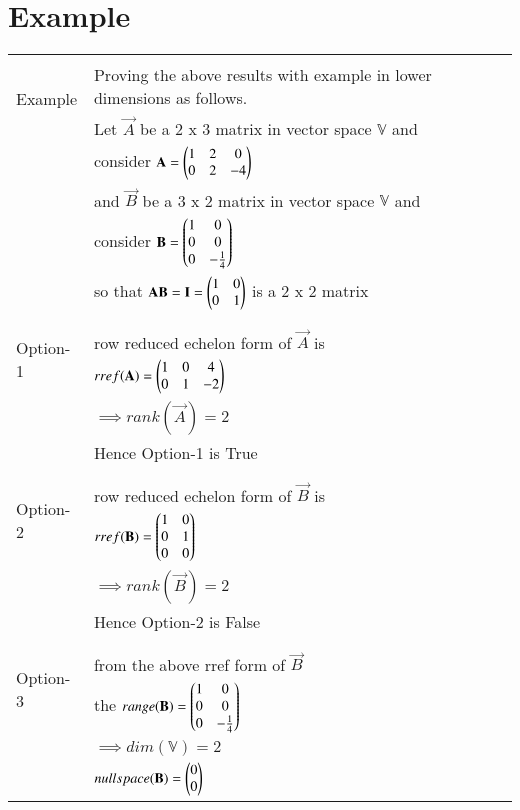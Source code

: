 \documentclass[journal,12pt]{IEEEtran}
\begin{document}
\section{\textbf{Example}}
\renewcommand{\thetable}{2}
\begin{longtable}{|l|l|}
\hline
\multirow{3}{*}{Example} & \\
& Proving the above results with example in lower dimensions as follows.\\
& Let $\vec{A}$ be a 2 x 3 matrix in vector space $\mathbb{V}$ and\\
& consider $\mathbf{A} = \begin{pmatrix}1&2&0\\0&2&-4\end{pmatrix}$\\
& and $\vec{B}$ be a 3 x 2 matrix in vector space $\mathbb{V}$ and\\
& consider $\mathbf{B} = \begin{pmatrix}1&0\\0&0\\0&-\frac{1}{4}\end{pmatrix}$\\
& so that $\mathbf{AB} = \mathbf{I} = \begin{pmatrix}1&0\\0&1\end{pmatrix}$ is a 2 x 2 matrix\\
& \\
\hline
\multirow{3}{*}{Option-1} & \\
& row reduced echelon form of $\vec{A}$ is\\
& $rref(\mathbf{A}) = \begin{pmatrix}1&0&4\\0&1&-2\end{pmatrix}$\\
& $\implies rank(\vec{A}) = 2$\\
& Hence Option-1 is True\\
&\\
\hline
\multirow{3}{*}{Option-2} & \\
& row reduced echelon form of $\vec{B}$ is\\
& $rref(\mathbf{B}) = \begin{pmatrix}1&0\\0&1\\0&0\end{pmatrix}$\\
& $\implies rank(\vec{B}) = 2$\\
& Hence Option-2 is False\\
&\\
\hline
\multirow{3}{*}{Option-3} & \\
& from the above rref form of $\vec{B}$\\
& the $range(\mathbf{B}) = \begin{pmatrix}1&0\\0&0\\0&-\frac{1}{4}\end{pmatrix}$\\
& $\implies dim(\mathbb{V}) = 2$\\
& $nullspace(\mathbf{B}) = \begin{pmatrix}0\\0\end{pmatrix}$\\

\end{longtable}
\end{document}
